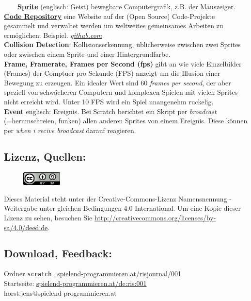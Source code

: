 \documentclass[10pt,a4paper,ngerman,twoside]{article} %
\begin{document}
\begin{multicols}{3}
~~~~\href{https://de.wikipedia.org/wiki/Sprite_(Computergrafik)}{\textbf{Sprite}} (englisch: Geist) bewegbare Computergrafik, z.B. der Mauszeiger.\\

\href{https://en.wikipedia.org/wiki/Source_code_repository}{\textbf{Code Repository}} eine Website auf der (Open Source) Code-Projekte gesammelt und verwaltet werden um weltweites gemeinsames Arbeiten zu ermöglichen. Beispiel. \href{http://github.com}{\textit{github.com}}\\

\textbf{Collision Detection}: Kollisionserkennung, üblicherweise zwischen zwei Sprites oder zwischen einem Sprite und einer Hintergrundfarbe. \\

\textbf{Frame, Framerate, Frames per Second (fps)} gibt an wie viele Einzelbilder (Frames) der Comptuer pro Sekunde (FPS) anzeigt um die Illusion einer Bewegung zu erzeugen. Ein idealer Wert sind 60 \textit{frames per second}, der aber speziell von schwächeren Computern und komplexen Spielen mit vielen Sprites nicht erreicht wird. Unter 10 FPS wird ein Spiel unangenehm ruckelig. \\

\textbf{Event} englisch: Ereignis. Bei Scratch berichtet ein Skript per \textit{broadcast} (=herumschreien, funken) allen anderen Sprites von einem Ereignis. Diese können per \textit{when i recive broadcast} darauf reagieren. \\


\subsection*{Lizenz, Quellen:}
\begin{figure}
\includegraphics[width=2cm]{powdertoytutorial/ccbysa88x31.png}
\end{figure}
Dieses Material steht unter der Creative-Commons-Lizenz Namensnennung - Weitergabe unter gleichen Bedingungen 4.0 International. Um eine Kopie dieser Lizenz zu sehen, besuchen Sie \url{http://creativecommons.org/licenses/by-sa/4.0/deed.de}.

\subsection*{Download, Feedback:}
\footnotesize{
Ordner \texttt{scratch} \Mundus\ \href{http://spielend-programmieren.at/risjournal/001}{spielend-programmieren.at/risjournal/001}\\
Startseite: \href{http://spielend-programmieren.at/de:ris:001}{spielend-programmieren.at/de:ris:001}\\ 
\Letter\:  horst.jens@spielend-programmieren.at \\}
\normalsize{}


\end{multicols}
\end{document}
